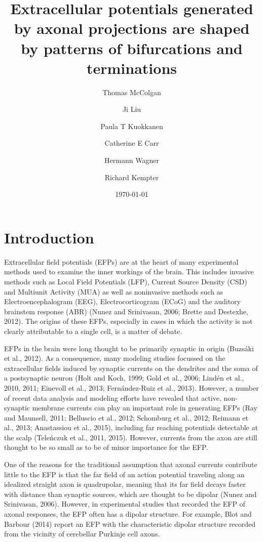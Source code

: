 \documentclass[]{article}
\title{Extracellular potentials generated by axonal projections are shaped by
patterns of bifurcations and terminations}
\author{Thomas McColgan \and Ji Liu \and Paula T Kuokkanen \and Catherine E Carr \and Hermann Wagner \and Richard Kempter}
\date{\today}
\begin{document}
\maketitle

\section{Introduction}\label{introduction}

Extracellular field potentials (EFPs) are at the heart of many
experimental methods used to examine the inner workings of the brain.
This includes invasive methods such as Local Field Potentials (LFP),
Current Source Density (CSD) and Multiunit Activity (MUA) as well as
noninvasive methods such as Electroencephalogram (EEG),
Electrocorticogram (ECoG) and the auditory brainstem response (ABR)
(Nunez and Srinivasan, 2006; Brette and Destexhe, 2012). The origins of
these EFPs, especially in cases in which the activity is not clearly
attributable to a single cell, is a matter of debate.

EFPs in the brain were long thought to be primarily synaptic in origin
(Buzsáki et al., 2012). As a consequence, many modeling studies focussed
on the extracellular fields induced by synaptic currents on the
dendrites and the soma of a postsynaptic neuron (Holt and Koch, 1999;
Gold et al., 2006; Lindén et al., 2010, 2011; Einevoll et al., 2013;
Fernández-Ruiz et al., 2013). However, a number of recent data analysis
and modeling efforts have revealed that active, non-synaptic membrane
currents can play an important role in generating EFPs (Ray and
Maunsell, 2011; Belluscio et al., 2012; Schomburg et al., 2012; Reimann
et al., 2013; Anastassiou et al., 2015), including far reaching
potentials detectable at the scalp (Teleńczuk et al., 2011, 2015).
However, currents from the axon are still thought to be so small as to
be of minor importance for the EFP.

One of the reasons for the traditional assumption that axonal currents
contribute little to the EFP is that the far field of an action
potential traveling along an idealized straight axon is quadrupolar,
meaning that its far field decays faster with distance than synaptic
sources, which are thought to be dipolar (Nunez and Srinivasan, 2006).
However, in experimental studies that recorded the EFP of axonal
responses, the EFP often has a dipolar structure. For example, Blot and
Barbour (2014) report an EFP with the characteristic dipolar structure
recorded from the vicinity of cerebellar Purkinje cell axons.
\end{document}
